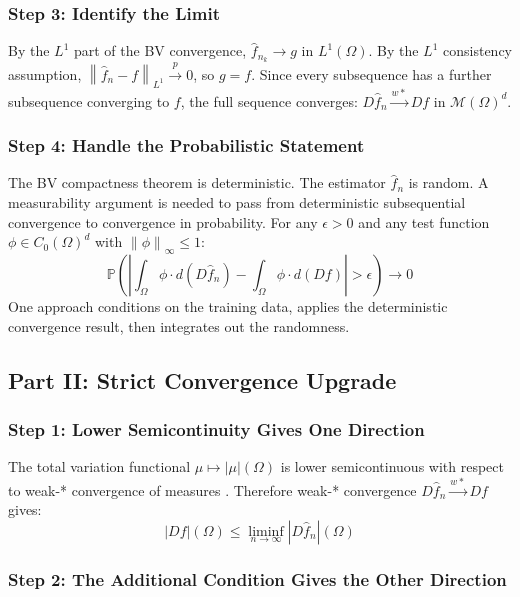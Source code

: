 \documentclass[12pt]{article}
\newcommand{\norm}[1]{\left\| #1 \right\|}
\newcommand{\Lone}{L^1(\Omega)}
\newcommand{\cM}{\mathcal{M}(\Omega)^d}
\newcommand{\fn}{\hat{f}_n}
\newcommand{\xrightarrowp}{\xrightarrow{p}}
\begin{document}
	\subsubsection*{Step 3: Identify the Limit}
	
	By the $L^1$ part of the BV convergence, $\hat{f}_{n_k} \to g$ in $\Lone$.
	By the $L^1$ consistency assumption, $\norm{\fn - f}_{L^1} \xrightarrowp 0$,
	so $g = f$. Since every subsequence has a further subsequence converging to
	$f$, the full sequence converges: $D\fn \xrightarrow{w*} Df$ in $\cM$.
	
	\subsubsection*{Step 4: Handle the Probabilistic Statement}
	
	The BV compactness theorem is deterministic. The estimator $\fn$ is random.
	A measurability argument is needed to pass from deterministic subsequential
	convergence to convergence in probability. For any $\epsilon > 0$ and any
	test function $\phi \in C_0(\Omega)^d$ with $\norm{\phi}_\infty \leq 1$:
	\begin{equation}
		\mathbb{P}\!\left(\left|
		\int_\Omega \phi \cdot d(D\fn) - \int_\Omega \phi \cdot d(Df)
		\right| > \epsilon\right) \to 0
	\end{equation}
	One approach conditions on the training data, applies the deterministic
	convergence result, then integrates out the randomness.
	
	\subsection{Part II: Strict Convergence Upgrade}
	
	\subsubsection*{Step 1: Lower Semicontinuity Gives One Direction}
	
	The total variation functional $\mu \mapsto |\mu|(\Omega)$ is lower
	semicontinuous with respect to weak-* convergence of measures
	\citep[Proposition~1.62]{ambrosio2000bv}. Therefore weak-* convergence
	$D\fn \xrightarrow{w*} Df$ gives:
	\begin{equation}
		|Df|(\Omega) \leq \liminf_{n \to \infty} |D\fn|(\Omega)
	\end{equation}
	
	\subsubsection*{Step 2: The Additional Condition Gives the Other Direction}
	
\end{document}
